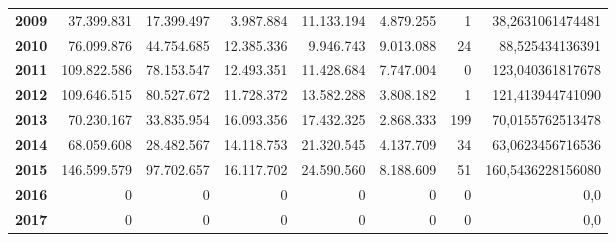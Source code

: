 \begin{table}[h!]
\begin{adjustbox}{width=1.5\textwidth, center}
\begin{tabular}{|l|r|r|r|r|r|r|r|}
        \textbf{2009}       & 37.399.831            & 17.399.497                        & 3.987.884                 & 11.133.194                            & 4.879.255                 & 1                             & 38,2631061474481                  \\
        \textbf{2010}       & 76.099.876            & 44.754.685                        & 12.385.336                & 9.946.743                             & 9.013.088                 & 24                            & 88,525434136391                   \\
        \textbf{2011}       & 109.822.586           & 78.153.547                        & 12.493.351                & 11.428.684                            & 7.747.004                 & 0                             & 123,040361817678                  \\
        \textbf{2012}       & 109.646.515           & 80.527.672                        & 11.728.372                & 13.582.288                            & 3.808.182                 & 1                             & 121,413944741090                  \\
        \textbf{2013}       & 70.230.167            & 33.835.954                        & 16.093.356                & 17.432.325                            & 2.868.333                 & 199                           & 70,0155762513478                  \\
        \textbf{2014}       & 68.059.608            & 28.482.567                        & 14.118.753                & 21.320.545                            & 4.137.709                 & 34                            & 63,0623456716536                  \\
        \textbf{2015}       & 146.599.579           & 97.702.657                        & 16.117.702                & 24.590.560                            & 8.188.609                 & 51                            & 160,5436228156080                 \\
        \textbf{2016}       & 0                     & 0                                 & 0                         & 0                                     & 0                         & 0                             & 0,0                               \\
        \textbf{2017}       & 0                     & 0                                 & 0                         & 0                                     & 0                         & 0                             & 0,0                               \\

\end{tabular}
\end{adjustbox}
\end{table}
